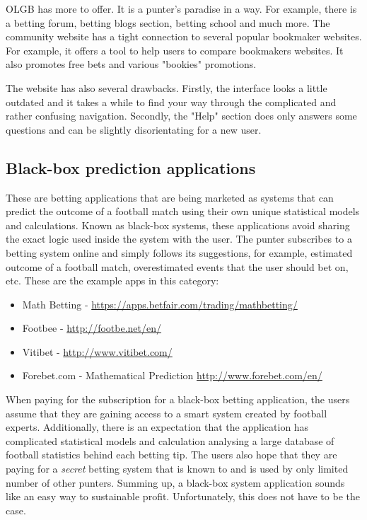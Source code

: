 OLGB has more to offer. It is a punter's paradise in a way. For example, there is a betting forum, betting blogs section, betting school and much more. The community website has a tight connection to several popular bookmaker websites. For example, it offers a tool to help users to compare bookmakers websites. It also promotes free bets and various "bookies" promotions.

The website has also several drawbacks. Firstly, the interface looks a little outdated and it takes a while to find your way through the complicated and rather confusing navigation. Secondly, the "Help" section does only answers some questions and can be slightly disorientating for a new user.


\subsection{Black-box prediction applications}
\label{subsec:blackboxapplications_req}
These are betting applications that are being marketed as systems that can predict the outcome of a football match using their own unique statistical models and calculations. Known as black-box systems, these applications avoid sharing the exact logic used inside the system with the user. The punter subscribes to a betting system online and simply follows its suggestions, for example, estimated outcome of a football match, overestimated events that the user should bet on, etc. These are the example apps in this category:

\begin{itemize}
	\item Math Betting  - \url{https://apps.betfair.com/trading/mathbetting/}
	\item Footbee - \url{http://footbe.net/en/}
	\item Vitibet - \url{http://www.vitibet.com/}
	\item Forebet.com - Mathematical Prediction \url{http://www.forebet.com/en/}
\end{itemize}

When paying for the subscription for a black-box betting application, the users assume that they are gaining access to a smart system created by football experts. Additionally, there is an expectation that the application has complicated statistical models and calculation analysing a large database of football statistics behind each betting tip. The users also hope that they are paying for a \emph{secret} betting system that is known to and is used by only limited number of other punters. Summing up, a black-box system application sounds like an easy way to sustainable profit. Unfortunately, this does not have to be the case. 

